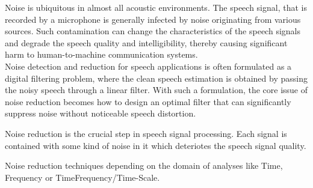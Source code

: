\begin{enumerate}
	Noise is ubiquitous in almost all acoustic environments. The speech signal, that is recorded by a microphone is generally infected by noise originating from various sources. Such contamination can change the characteristics of the speech signals and degrade the speech quality and intelligibility, thereby causing significant harm to human-to-machine communication systems. \\
	Noise detection and reduction for speech applications is often formulated as a digital filtering problem, where the clean speech estimation is obtained by passing the noisy speech through a linear filter. With such a formulation, the core issue of noise reduction becomes how to design an optimal filter that can significantly suppress noise without noticeable speech distortion. 
	
	Noise reduction is the crucial step in speech signal processing. Each signal is contained with some kind of noise in it which deteriotes the speech signal quality. 
	
	Noise reduction techniques depending on the domain of analyses like Time, Frequency or TimeFrequency/Time-Scale. 
	

\end{enumerate}
